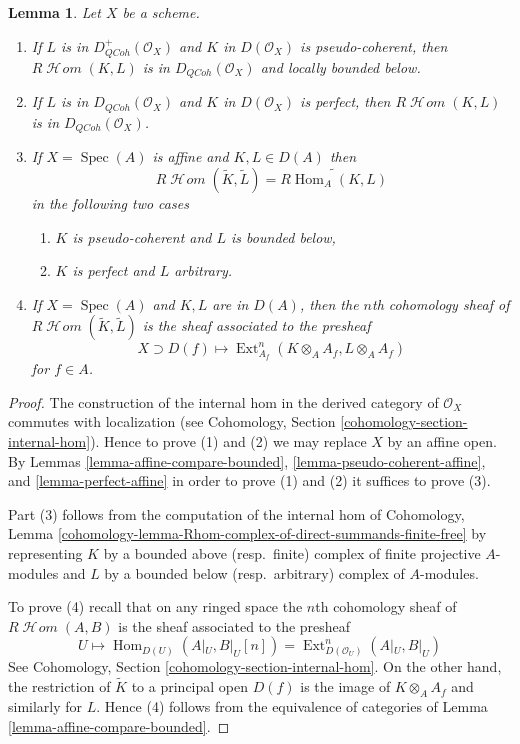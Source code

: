 \documentclass{stacks-project}
\theoremstyle{plain}
\newtheorem{lemma}[subsection]{Lemma}
\theoremstyle{definition}
\theoremstyle{remark}
\numberwithin{equation}{subsection}
\def\Spec{\mathop{\mathrm{Spec}}}
\def\Hom{\mathop{\mathrm{Hom}}\nolimits}
\def\Ext{\mathop{\mathrm{Ext}}\nolimits}
\def\SheafHom{\mathop{\mathcal{H}\!\mathit{om}}\nolimits}
\def\QCoh{\mathit{QCoh}}
\begin{document}
\begin{lemma}
\label{lemma-quasi-coherence-internal-hom}
Let $X$ be a scheme.
\begin{enumerate}
\item If $L$ is in $D^+_\QCoh(\mathcal{O}_X)$ and
$K$ in $D(\mathcal{O}_X)$ is pseudo-coherent, then
$R\SheafHom(K, L)$ is in $D_\QCoh(\mathcal{O}_X)$
and locally bounded below.
\item If $L$ is in $D_\QCoh(\mathcal{O}_X)$ and
$K$ in $D(\mathcal{O}_X)$ is perfect, then
$R\SheafHom(K, L)$ is in $D_\QCoh(\mathcal{O}_X)$.
\item If $X = \Spec(A)$ is affine and $K, L \in D(A)$ then
$$
R\SheafHom(\widetilde{K}, \widetilde{L}) = \widetilde{R\Hom_A(K, L)}
$$
in the following two cases
\begin{enumerate}
\item $K$ is pseudo-coherent and $L$ is bounded below,
\item $K$ is perfect and $L$ arbitrary.
\end{enumerate}
\item If $X = \Spec(A)$ and $K, L$ are in $D(A)$, then the $n$th
cohomology sheaf of $R\SheafHom(\widetilde{K}, \widetilde{L})$
is the sheaf associated to the presheaf
$$
X \supset D(f) \longmapsto \Ext^n_{A_f}(K \otimes_A A_f, L \otimes_A A_f)
$$
for $f \in A$.
\end{enumerate}
\end{lemma}

\begin{proof}
The construction of the internal hom in the derived category of
$\mathcal{O}_X$ commutes with localization (see
Cohomology, Section \ref{cohomology-section-internal-hom}).
Hence to prove (1) and (2) we may replace $X$ by an affine open.
By Lemmas \ref{lemma-affine-compare-bounded},
\ref{lemma-pseudo-coherent-affine}, and
\ref{lemma-perfect-affine}
in order to prove (1) and (2) it suffices to prove (3).

\medskip\noindent
Part (3) follows from the computation of the
internal hom of Cohomology, Lemma
\ref{cohomology-lemma-Rhom-complex-of-direct-summands-finite-free}
by representing $K$ by a bounded above (resp.\ finite) complex of
finite projective $A$-modules and $L$ by a bounded below
(resp.\ arbitrary) complex of $A$-modules.

\medskip\noindent
To prove (4) recall that on any ringed space the $n$th cohomology sheaf of
$R\SheafHom(A, B)$ is the sheaf associated to the presheaf
$$
U \mapsto \Hom_{D(U)}(A|_U, B|_U[n]) =
\Ext^n_{D(\mathcal{O}_U)}(A|_U, B|_U)
$$
See Cohomology, Section \ref{cohomology-section-internal-hom}.
On the other hand, the restriction of $\widetilde{K}$ to a principal
open $D(f)$ is the image of $K \otimes_A A_f$ and similarly for $L$.
Hence (4) follows from the equivalence of categories of
Lemma \ref{lemma-affine-compare-bounded}.
\end{proof}
\end{document}
